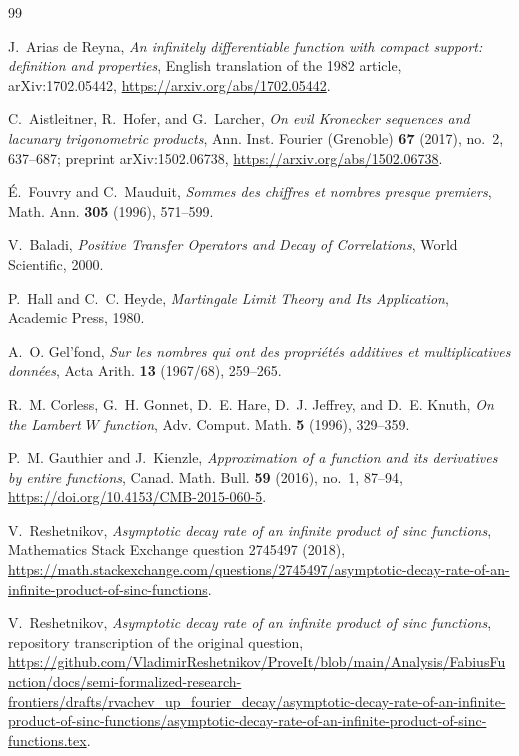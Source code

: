 \documentclass[11pt]{article}
\theoremstyle{definition}
\theoremstyle{remark}
\begin{document}
\begin{thebibliography}{99}

J.~Arias de Reyna,
\emph{An infinitely differentiable function with compact support: definition and properties},
English translation of the 1982 article, arXiv:1702.05442,
\url{https://arxiv.org/abs/1702.05442}.

C.~Aistleitner, R.~Hofer, and G.~Larcher,
\emph{On evil Kronecker sequences and lacunary trigonometric products},
Ann. Inst. Fourier (Grenoble) \textbf{67} (2017), no.~2, 637--687;
preprint arXiv:1502.06738,
\url{https://arxiv.org/abs/1502.06738}.

\'E.~Fouvry and C.~Mauduit,
\emph{Sommes des chiffres et nombres presque premiers},
Math. Ann. \textbf{305} (1996), 571--599.

V.~Baladi,
\emph{Positive Transfer Operators and Decay of Correlations},
World Scientific, 2000.

P.~Hall and C.~C. Heyde,
\emph{Martingale Limit Theory and Its Application},
Academic Press, 1980.

A.~O. Gel'fond,
\emph{Sur les nombres qui ont des propri\'et\'es additives et multiplicatives donn\'ees},
Acta Arith. \textbf{13} (1967/68), 259--265.

R.~M. Corless, G.~H. Gonnet, D.~E. Hare, D.~J. Jeffrey, and D.~E. Knuth,
\emph{On the Lambert \(W\) function},
Adv. Comput. Math. \textbf{5} (1996), 329--359.

P.~M. Gauthier and J.~Kienzle,
\emph{Approximation of a function and its derivatives by entire functions},
Canad. Math. Bull. \textbf{59} (2016), no.~1, 87--94,
\url{https://doi.org/10.4153/CMB-2015-060-5}.

V.~Reshetnikov,
\emph{Asymptotic decay rate of an infinite product of sinc functions},
Mathematics Stack Exchange question 2745497 (2018),
\url{https://math.stackexchange.com/questions/2745497/asymptotic-decay-rate-of-an-infinite-product-of-sinc-functions}.

V.~Reshetnikov,
\emph{Asymptotic decay rate of an infinite product of sinc functions},
repository transcription of the original question,
\url{https://github.com/VladimirReshetnikov/ProveIt/blob/main/Analysis/FabiusFunction/docs/semi-formalized-research-frontiers/drafts/rvachev_up_fourier_decay/asymptotic-decay-rate-of-an-infinite-product-of-sinc-functions/asymptotic-decay-rate-of-an-infinite-product-of-sinc-functions.tex}.


\end{thebibliography}
\end{document}
